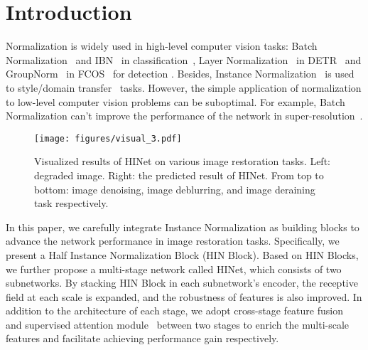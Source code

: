 \documentclass[final]{cvpr}
\begin{document}
\section{Introduction}
Normalization is widely used in high-level computer vision tasks: Batch Normalization~\cite{ioffe2015batch} and IBN~\cite{pan2018two} in classification~\cite{ma2018shufflenet}, Layer Normalization~\cite{ba2016layer} in DETR~\cite{carion2020end} and GroupNorm~\cite{wu2018group} in FCOS~\cite{tian2019fcos} for detection \etc. Besides, Instance Normalization~\cite{ulyanov2017improved} is used to style/domain transfer~\cite{pan2018two, huang2017arbitrary} tasks. However, the simple application of normalization to low-level computer vision problems can be suboptimal. For example, Batch Normalization can't improve the performance of the network in super-resolution~\cite{lim2017enhanced}.


\begin{figure}[t]
    \centering
    \texttt{[image: figures/visual\_3.pdf]}
    \vspace{-0.2cm}
    \caption{Visualized results of HINet on various image restoration tasks. Left: degraded image. Right: the predicted result of HINet. From top to bottom: image denoising, image deblurring, and image deraining task respectively.}
    \label{fig:visual_3}
    \vspace{-0.2cm}
\end{figure}

In this paper, we carefully integrate Instance Normalization as building blocks to advance the network performance in image restoration tasks. Specifically, we present a Half Instance Normalization Block (HIN Block). Based on HIN Blocks, we further propose a multi-stage network called HINet, which consists of two subnetworks. By stacking HIN Block in each subnetwork's encoder, the receptive field at each scale is expanded, and the robustness of features is also improved. In addition to the architecture of each stage, we adopt cross-stage feature fusion~\cite{zamir2021multi} and supervised attention module~\cite{zamir2021multi} between two stages to enrich the multi-scale features and facilitate achieving performance gain respectively. 
\end{document}
